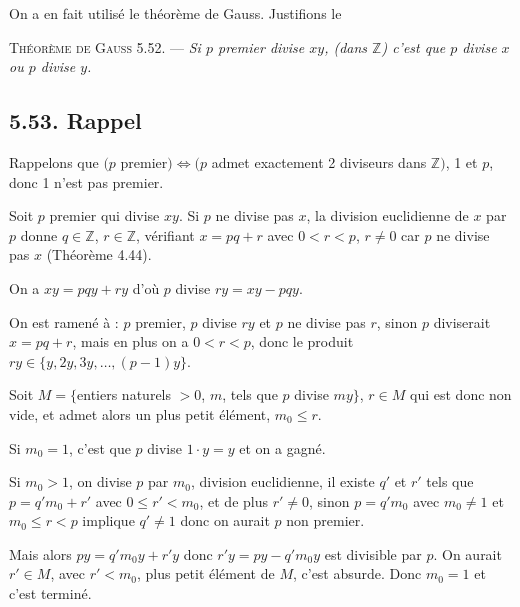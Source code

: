 On a en fait utilisé le théorème de Gauss. Justifions le

\medskip\noindent\textsc{Théorème de Gauss 5.52.} --- \emph{Si $p$ premier divise $xy$, (dans $\mathbb Z$) c'est que $p$ divise $x$ ou $p$ divise $y$.}

\subsection*{5.53. Rappel}
Rappelons que $(p$ premier$)\Longleftrightarrow(p$ admet exactement 2 diviseurs dans $\mathbb Z)$, 1 et $p$, donc 1 n'est pas premier.

Soit $p$ premier qui divise $xy$. Si $p$ ne divise pas $x$, la division euclidienne de $x$ par $p$ donne $q\in\mathbb Z$, $r\in\mathbb Z$, vérifiant $x=pq+r$ avec $0<r<p$, $r\ne0$ car $p$ ne divise pas $x$ (Théorème 4.44).

On a $xy=pqy+ry$ d'où $p$ divise $ry=xy-pqy$.

On est ramené à : $p$ premier, $p$ divise $ry$ et $p$ ne divise pas $r$, sinon $p$ diviserait $x=pq+r$, mais en plus on a $0<r<p$, donc le produit $ry\in\{y,2y,3y,\ldots,(p-1)y\}$.

Soit $M=\{$entiers naturels $>0$, $m$, tels que $p$ divise $my\}$, $r\in M$ qui est donc non vide, et admet alors un plus petit élément, $m_0\le r$.

Si $m_0=1$, c'est que $p$ divise $1\cdot y=y$ et on a gagné.

Si $m_0>1$, on divise $p$ par $m_0$, division euclidienne, il existe $q'$ et $r'$ tels que $p=q'm_0+r'$ avec $0\le r'<m_0$, et de plus $r'\ne0$, sinon $p=q'm_0$ avec $m_0\ne1$ et $m_0\le r<p$ implique $q'\ne1$ donc on aurait $p$ non premier.

Mais alors $py=q'm_0y+r'y$ donc $r'y=py-q'm_0y$ est divisible par $p$. On aurait $r'\in M$, avec $r'<m_0$, plus petit élément de $M$, c'est absurde. Donc $m_0=1$ et c'est terminé. \bookend


